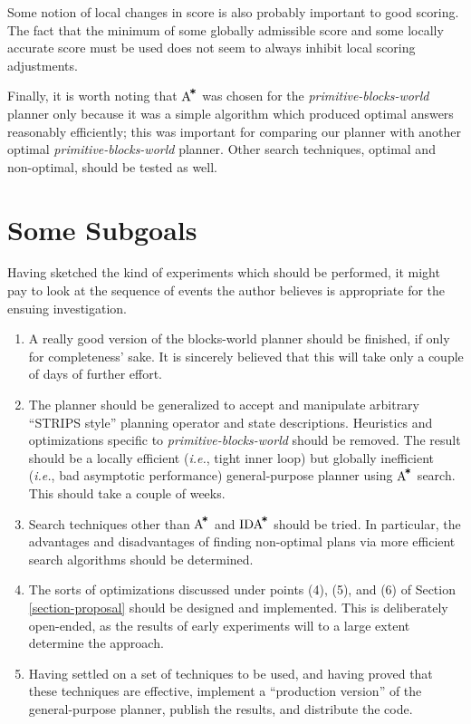\documentclass{article}
\newcommand{\sbw}{{\em primitive-blocks-world}}
\newcommand{\astar}{{$\mbox{A}^{\!\mbox{\tt *}}$}}
\newcommand{\idastar}{{$\mbox{IDA}^{\!\mbox{\tt *}}$}}
\begin{document}
\begin{description}
Some notion of local changes in score is also probably important
to good scoring. The fact that the minimum of some globally
admissible score and some locally accurate score must be used
does not seem to always inhibit local scoring adjustments.

\end{description}

Finally, it is worth noting that \astar{} was chosen for the
\sbw{} planner only because it was a simple algorithm which
produced optimal answers reasonably efficiently; this was important
for comparing our planner with another optimal \sbw{} planner.
Other search techniques, optimal and non-optimal, should
be tested as well.

\section{Some Subgoals}
\label{section-subgoals}

Having sketched the kind of experiments which should be performed,
it might pay to look at the sequence of events the author believes
is appropriate for the ensuing investigation.
\begin{enumerate}
\item 
A really good version of the blocks-world planner should
be finished, if only for completeness' sake.  It is sincerely believed that
this will take only a couple of days of further effort.
\item
The planner should be generalized to accept and manipulate
arbitrary ``{\sc STRIPS} style'' \cite{fikes-nilsson}
planning operator and state descriptions.
Heuristics and optimizations specific to \sbw{} should be
removed.  The result should be a locally efficient ({\em i.e.}, tight
inner loop) but globally inefficient ({\em i.e.}, bad asymptotic
performance) general-purpose planner using \astar{} search.
This should take a couple of weeks.
\item
Search techniques other than \astar{} and \idastar{} should be
tried.  In particular, the advantages and disadvantages of finding
non-optimal plans via more efficient search algorithms should be determined.
\item
The sorts of optimizations discussed under points (4), (5), and
(6) of Section \ref{section-proposal} should be designed and implemented.
This is deliberately open-ended, as the results of early experiments
will to a large extent determine the approach.
\item
Having settled on a set of techniques to be used, and having proved
that these techniques are effective, implement a ``production version''
of the general-purpose planner, publish the results, and distribute
the code.
\end{enumerate}
\end{document}
